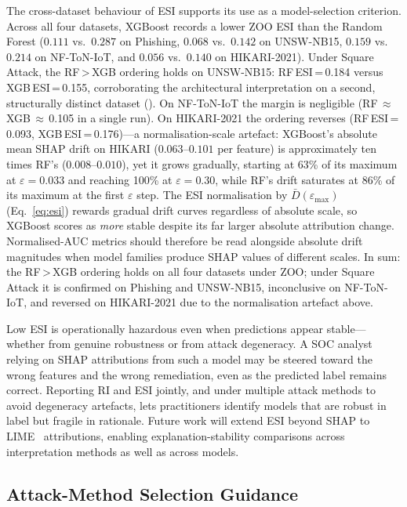 \documentclass[runningheads]{llncs}
\begin{document}
The cross-dataset behaviour of ESI supports its use as a model-selection
criterion.  Across all four datasets, XGBoost records a lower ZOO ESI than the
Random Forest ($0.111$ vs.\ $0.287$ on Phishing, $0.068$ vs.\ $0.142$ on
UNSW-NB15, $0.159$ vs.\ $0.214$ on NF-ToN-IoT, and $0.056$ vs.\ $0.140$ on
HIKARI-2021).  Under Square Attack, the RF\,>\,XGB ordering holds on UNSW-NB15:
RF\,ESI\,=\,0.184 versus XGB\,ESI\,=\,0.155, corroborating the architectural
interpretation on a second, structurally distinct dataset
().  On NF-ToN-IoT the margin is negligible
(RF\,$\approx$\,XGB\,$\approx$\,0.105 in a single run).  On HIKARI-2021 the
ordering reverses (RF\,ESI\,=\,0.093, XGB\,ESI\,=\,0.176)---a normalisation-scale
artefact: XGBoost's absolute mean SHAP drift on HIKARI ($0.063$--$0.101$ per
feature) is approximately ten times RF's ($0.008$--$0.010$), yet it grows
gradually, starting at 63\% of its maximum at $\varepsilon=0.033$ and reaching
100\% at $\varepsilon=0.30$, while RF's drift saturates at 86\% of its maximum
at the first $\varepsilon$ step.  The ESI normalisation by
$\bar{D}(\varepsilon_{\max})$ (Eq.~\ref{eq:esi}) rewards gradual drift curves
regardless of absolute scale, so XGBoost scores as \emph{more} stable despite
its far larger absolute attribution change.  Normalised-AUC metrics should
therefore be read alongside absolute drift magnitudes when model families
produce SHAP values of different scales.  In sum: the RF\,>\,XGB ordering holds
on all four datasets under ZOO; under Square Attack it is confirmed on Phishing
and UNSW-NB15, inconclusive on NF-ToN-IoT, and reversed on HIKARI-2021 due to
the normalisation artefact above.

Low ESI is operationally hazardous even when predictions appear stable---whether
from genuine robustness or from attack degeneracy.  A SOC analyst relying on
SHAP attributions from such a model may be steered toward the wrong features
and the wrong remediation, even as the predicted label remains correct.
Reporting RI and ESI jointly, and under multiple attack methods to avoid
degeneracy artefacts, lets practitioners identify models that are robust in
label but fragile in rationale.  Future work will extend ESI beyond SHAP to
LIME~\cite{ribeiro2016lime} attributions, enabling explanation-stability
comparisons across interpretation methods as well as across models.

\subsection{Attack-Method Selection Guidance}
\label{sec:attack_guidance}
\end{document}

